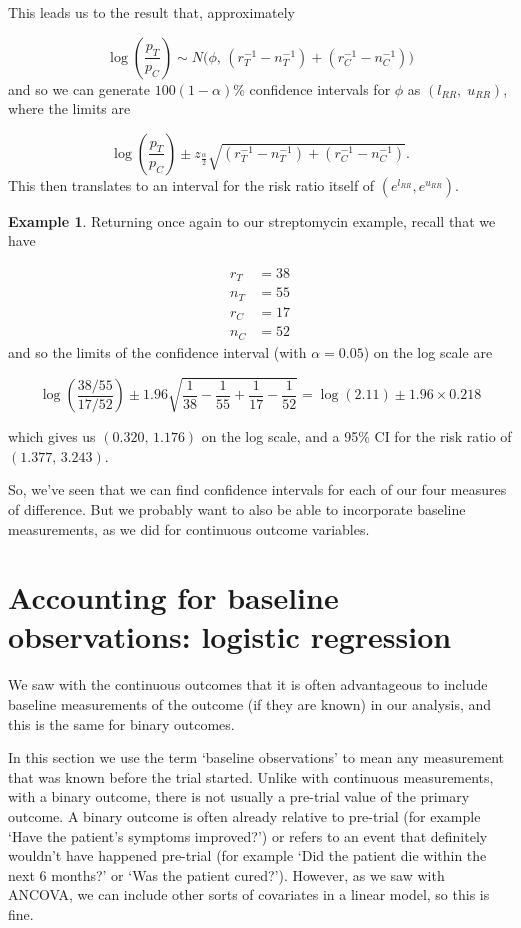 \documentclass[
  openany]{book}
\theoremstyle{definition}
\theoremstyle{definition}
\newtheorem{example}{Example}[chapter]
\theoremstyle{definition}
\theoremstyle{definition}
\theoremstyle{remark}
\begin{document}
This leads us to the result that, approximately

\[\log\left(\frac{p_T}{p_C}\right) \sim N\bigg(\phi,\,\left(r_T^{-1} - n_T^{-1}\right) + \left(r_C^{-1} - n_C^{-1}\right) \bigg) \] and so we can generate \(100\left(1-\alpha\right)\)\% confidence intervals for \(\phi\) as \(\left(l_{RR},\;u_{RR}\right)\), where the limits are

\[
\log\left(\frac{p_T}{p_C}\right) \pm z_{\frac{\alpha}{2}}\sqrt{\left(r_T^{-1} - n_T^{-1}\right) + \left(r_C^{-1} - n_C^{-1}\right)}.
\]
This then translates to an interval for the risk ratio itself of \(\left(e^{l_{RR}},e^{u_{RR}}\right)\).

\begin{example}
Returning once again to our streptomycin example, recall that we have

\[
\begin{aligned}
r_T & = 38\\
n_T & = 55 \\
r_C & = 17 \\
n_C & = 52
\end{aligned}
\]
and so the limits of the confidence interval (with \(\alpha=0.05\)) on the log scale are

\[\log\left(\frac{38/55}{17/52}\right) \pm 1.96\sqrt{\frac{1}{38} - \frac{1}{55} + \frac{1}{17} - \frac{1}{52}} = \log(2.11) \pm 1.96 \times 0.218\]

which gives us \(\left(0.320,\,1.176\right)\) on the log scale, and a 95\% CI for the risk ratio of \(\left(1.377,\,3.243\right)\).
\end{example}

So, we've seen that we can find confidence intervals for each of our four measures of difference. But we probably want to also be able to incorporate baseline measurements, as we
did for continuous outcome variables.

\hypertarget{accounting-for-baseline-observations-logistic-regression}{%
\section{Accounting for baseline observations: logistic regression}\label{accounting-for-baseline-observations-logistic-regression}}

We saw with the continuous outcomes that it is often advantageous to include baseline measurements of the outcome (if they are known) in our analysis, and this is the same for binary outcomes.

In this section we use the term `baseline observations' to mean any measurement that was known before the trial started. Unlike with continuous measurements, with a binary outcome, there is not usually a pre-trial value of the primary outcome. A binary outcome is often already relative to pre-trial (for example `Have the patient's symptoms improved?') or refers to an event that definitely wouldn't have happened pre-trial (for example `Did the patient die within the next 6 months?' or `Was the patient cured?'). However, as we saw with ANCOVA, we can include other sorts of covariates in a linear model, so this is fine.
\end{document}
